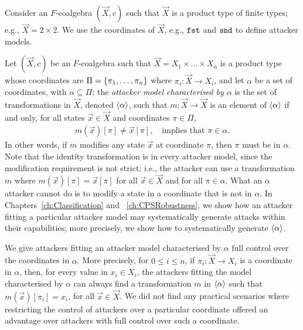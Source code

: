 Consider an $F$-coalgebra $(\vec{X},c)$ such that $\vec{X}$ is a product type of finite types; e.g., $\vec{X}=2\times 2$. We use the coordinates of $\vec{X}$, e.g., $\mathtt{\texttt{fst}}$ and $\mathtt{\texttt{snd}}$ to define attacker models. 
\begin{definition}
\label{def:Latent:AttackerModel}
Let $(\vec{X},c)$ be an $F$-coalgebra such that $\vec{X}=X_1\times\ldots\times X_n$ is a product type whose coordinates are $\Pi=\left\{\pi_1, \ldots, \pi_n\right\}$ where $\pi_i\colon \vec{X}\rightarrow X_i$, and let $\alpha$ be a set of coordinates, with $\alpha\subseteq \Pi$; the \emph{attacker model characterised by $\alpha$} is the set of transformations in $\vec{X}$, denoted ${{\left<\alpha\right>}}$, such that $m\colon \vec{X}\rightarrow \vec{X}$ is an element of ${{\left<\alpha\right>}}$ if and only, for all states $\vec{x}\in \vec{X}$ and coordinates $\pi\in \Pi$, 
\begin{align}
    m(\vec{x})[\pi]\neq \vec{x}[\pi],\quad \text{implies that $\pi\in \alpha$}.
\end{align}
In other words, if $m$ modifies any state $\vec{x}$ at coordinate $\pi$, then $\pi$ must be in $\alpha$. Note that the identity transformation is in every attacker model, since the modification requirement is not strict; i.e., the attacker can use a transformation $m$ where $m(\vec{x})[\pi]= \vec{x}[\pi]$ for all $\vec{x}\in \vec{X}$ and for all $\pi \in \alpha$. What an $\alpha$ attacker cannot do is to modify a state in a coordinate that is not in $\alpha$. In Chapters~\ref{ch:Classification} and ~\ref{ch:CPSRobustness}, we show how an attacker fitting a particular attacker model may systematically generate attacks within their capabilities; more precisely, we show how to systematically generate ${{\left<\alpha\right>}}$.

We give attackers fitting an attacker model characterised by $\alpha$ full control over the coordinates in $\alpha$. More precisely, for $0\leq i \leq n$, if $\pi_i\colon \vec{X}\rightarrow X_i$ is a coordinate in $\alpha$, then, for every value in $x_i\in X_i$, the attackers fitting the model characterised by $\alpha$ can always find a transformation $m$ in ${{\left<\alpha\right>}}$ such that $m(\vec{x})[\pi_i]=x_i$, for all $\vec{x}\in \vec{X}$. We did not find any practical scenarios where restricting the control of attackers over a particular coordinate offered an advantage over attackers with full control over such a coordinate.
\end{definition}
